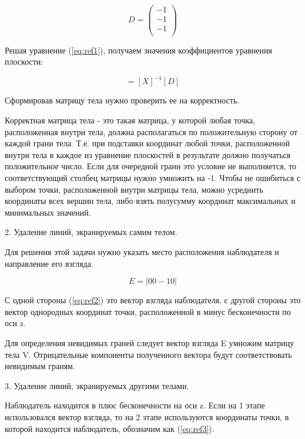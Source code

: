 ~

\begin{equation}
	D = \left(
	\begin{array}{c}
			-1 \\
			-1 \\
			-1 \\
		\end{array}
	\right)
\end{equation}

Решая уравнение (\ref{eq:ref1}), получаем значения коэффициентов уравнения плоскости:

\begin{equation}
	[C] = [X]^{-1}[D]
\end{equation}

Сформировав матрицу тела нужно проверить ее на корректность.

Корректная матрица тела - это такая матрица, у которой любая точка, расположенная внутри тела, должна располагаться по положительную сторону от каждой грани тела. Т.е. при подставки координат любой точки, расположенной внутри тела в каждое из уравнение плоскостей в результате должно получаться положительное число. Если для очередной грани это условие не выполняется, то соответствующий столбец матрицы нужно умножить на -1. Чтобы не ошибиться с выбором точки, расположенной внутри матрицы тела, можно усреднить координаты всех вершин тела, либо взять полусумму координат максимальных и минимальных значений.

2. Удаление линий, экранируемых самим телом.

Для решения этой задачи нужно указать место расположения наблюдателя и направление его взгляда.

\begin{equation}
	E = |00-10|
	\label{eq:ref2}
\end{equation}

С одной стороны (\ref{eq:ref2}) это вектор взгляда наблюдателя, с другой стороны это вектор однородных координат точки, расположенной в минус бесконечности по оси z.

Для определения невидимых граней следует вектор взгляда E умножим матрицу тела V. Отрицательные компоненты полученного вектора будут соответствовать невидимым граням.

3. Удаление линий, экранируемых другими телами.

Наблюдатель находится в плюс бесконечности на оси z. Если на 1 этапе использовался вектор взгляда, то на 2 этапе используются координаты точки, в которой находится наблюдатель, обозначим как (\ref{eq:ref3}).

